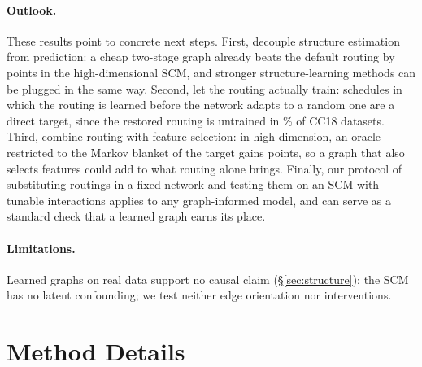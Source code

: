 \documentclass[anon,12pt]{clear2027} %
\begin{document}
\paragraph{Outlook.} These results point to concrete next steps. First, decouple structure estimation from prediction: a cheap two-stage graph already beats the default routing by \SynHighEstLearnAbs{} points in the high-dimensional SCM, and stronger structure-learning methods can be plugged in the same way. Second, let the routing actually train: schedules in which the routing is learned before the network adapts to a random one are a direct target, since the restored routing is untrained in \DagBaseUntrained{}\% of CC18 datasets. Third, combine routing with feature selection: in high dimension, an oracle restricted to the Markov blanket of the target gains \SynHighMbLgbLamOneAbs{} points, so a graph that also selects features could add to what routing alone brings. Finally, our protocol of substituting routings in a fixed network and testing them on an SCM with tunable interactions applies to any graph-informed model, and can serve as a standard check that a learned graph earns its place.

\paragraph{Limitations.} Learned graphs on real data support no causal claim (\S\ref{sec:structure}); the SCM has no latent confounding; we test neither edge orientation nor interventions.




\appendix
\section{Method Details}
\label{app:method}
\end{document}
